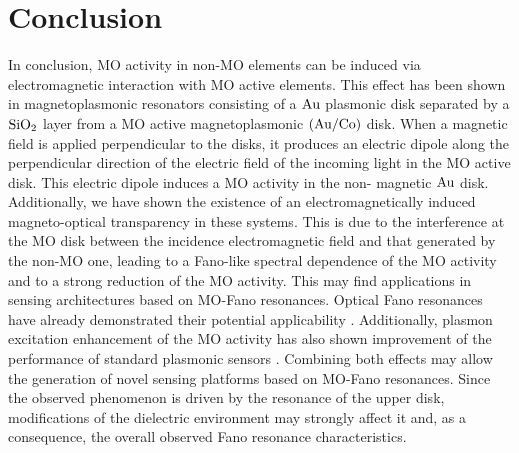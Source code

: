 \section{Conclusion \label{sec:chap3_conclusions}}
In conclusion, MO activity in non-MO elements can be induced via electromagnetic interaction with MO active elements. This effect has been shown in magnetoplasmonic resonators consisting of a $\textnormal{Au}$ plasmonic disk separated by a $\textnormal{SiO}_{2}$ layer from a MO active magnetoplasmonic $\left(\textnormal{Au}/\textnormal{Co}\right)$ disk. When a magnetic field is applied perpendicular to the disks, it produces an electric dipole along the perpendicular direction of the electric field of the incoming light in the MO active disk. This electric dipole induces a MO activity in the non- magnetic $\textnormal{Au}$ disk. Additionally, we have shown the existence of an electromagnetically induced magneto-optical transparency in these systems. This is due to the interference at the MO disk between the incidence electromagnetic field and that generated by the non-MO one, leading to a Fano-like spectral dependence of the MO activity and to a strong reduction of the MO activity. This may find applications in sensing architectures based on MO-Fano resonances. Optical Fano resonances have already demonstrated their potential applicability \cite{yanik2011seeing, wu2012fano, offermans2011universal}. Additionally, plasmon excitation enhancement of the MO activity has also shown improvement of the performance of standard plasmonic sensors \cite{sepulveda2006highly, bonanni2011designer}. Combining both effects may allow the generation of novel sensing platforms based on MO-Fano resonances. Since the observed phenomenon is driven by the resonance of the upper disk, modifications of the dielectric environment may strongly affect it and, as a consequence, the overall observed Fano resonance characteristics.


